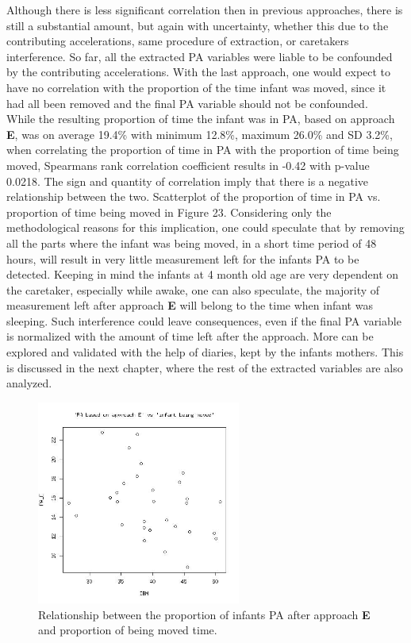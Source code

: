 \documentclass{article}
\begin{document}
{Although there is less significant correlation then in previous approaches, there is still a substantial amount, but again with uncertainty, whether this due to the contributing accelerations, same procedure of extraction, or caretakers interference. So far, all the extracted PA variables were liable to be confounded by the contributing accelerations. With the last approach, one would expect to have no correlation with the proportion of the time infant was moved, since it had all been removed and the final PA variable should not be confounded. \\
While the resulting proportion of time the infant was in PA, based on approach \textbf{E}, was on average 19.4\% with minimum 12.8\%, maximum 26.0\% and SD 3.2\%, when correlating the proportion of time in PA with the proportion of time being moved, Spearmans rank correlation coefficient results in -0.42 with p-value 0.0218. The sign and quantity of correlation imply that there is a negative relationship between the two. Scatterplot of the proportion of time in PA vs. proportion of time being moved in Figure 23. Considering only the methodological reasons for this implication, one could speculate that by removing all the parts where the infant was being moved, in a short time period of 48 hours, will result in very little measurement left for the infants PA to be detected. Keeping in mind the infants at 4 month old age are very dependent on the caretaker, especially while awake, one can also speculate, the majority of measurement left after approach \textbf{E} will belong to the time when infant was sleeping. Such interference could leave consequences, even if the final PA variable is normalized with the amount of time left after the approach. More can be explored and validated with the help of diaries, kept by the infants mothers. This is discussed in the next chapter, where the rest of the extracted variables are also analyzed. 
 \begin{figure}[h!]
\includegraphics[width=6.7cm, height=6.7cm]{scatterplotPAEIBM.jpg}
\caption{Relationship between the proportion of infants PA after approach \textbf{E} and proportion of being moved time.}
\end{figure}
\\
}
\end{document}

